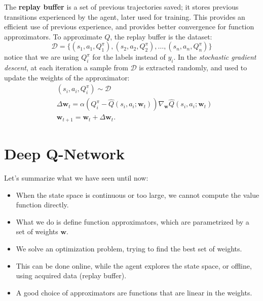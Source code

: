 \documentclass[10pt, a4paper]{report}
\begin{document}
The \textbf{replay buffer} is a set of previous trajectories saved; it stores previous transitions experienced by the agent, later used for training. This provides an efficient use of previous experience, and provides better convergence for function approximators.
To approximate $Q$, the replay buffer is the dataset:\begin{equation}
    \mathcal D= \{(s_1,a_1,Q_1^\pi),
    (s_2,a_2,Q_2^\pi),\dots,
     (s_n,a_n,Q_n^\pi)\}
\end{equation}
notice that we are using $Q_i^\pi$ for the labels instead of $y_i$. In the \textit{stochastic gradient descent}, at each iteration a sample from $\mathcal D$ is extracted randomly, and used to update the weights of the approximator:\begin{align}
&(s_i,a_i,Q_i^\pi)\sim\mathcal D\\
&\Delta\mathbf w_t = \alpha\left(
    Q^\pi_i-\hat Q(s_i,a_i;\mathbf w_t)
\right)\nabla_{\mathbf w}\hat Q(s_i,a_i;\mathbf w_t)\\
&\mathbf w_{t+1}=\mathbf w_t+\Delta\mathbf w_t.
\end{align}
\section{Deep Q-Network}
Let's summarize what we have seen until now:\begin{itemize}
    \item When the state space is continuous or too large, we cannot compute the value function directly.
    \item What we do is define function approximators, which are parametrized by a set of weights $\mathbf w$.
    \item We solve an optimization problem, trying to find the best set of weights.
    \item This can be done online, while the agent explores the state space, or offline, using acquired data (replay buffer).
    \item A good choice of approximators are functions that are linear in the weights.
\end{itemize}
\end{document}
